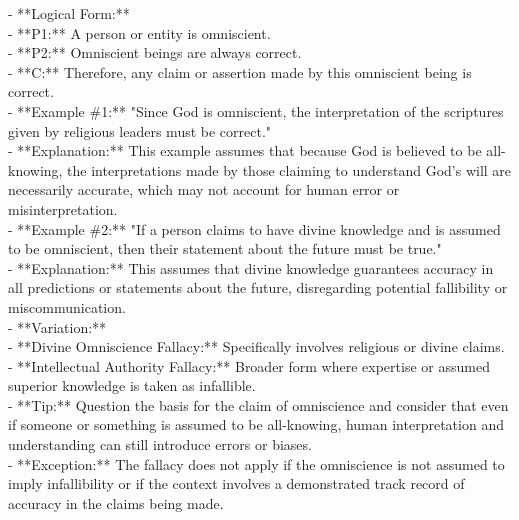 \documentclass[a4paper,12pt,single,pdftex]{scrartcl}
\begin{document}
    
      - **Logical Form:**
    \\

    
        - **P1:** A person or entity is omniscient.
    \\

    
        - **P2:** Omniscient beings are always correct.
    \\

    
        - **C:** Therefore, any claim or assertion made by this omniscient being is correct.
    \\

    
      - **Example \#1:** "Since God is omniscient, the interpretation of the scriptures given by religious leaders must be correct."
    \\

    
      - **Explanation:** This example assumes that because God is believed to be all-knowing, the interpretations made by those claiming to understand God’s will are necessarily accurate, which may not account for human error or misinterpretation.
    \\

    
      - **Example \#2:** "If a person claims to have divine knowledge and is assumed to be omniscient, then their statement about the future must be true."
    \\

    
      - **Explanation:** This assumes that divine knowledge guarantees accuracy in all predictions or statements about the future, disregarding potential fallibility or miscommunication.
    \\

    
      - **Variation:**
    \\

    
        - **Divine Omniscience Fallacy:** Specifically involves religious or divine claims.
    \\

    
        - **Intellectual Authority Fallacy:** Broader form where expertise or assumed superior knowledge is taken as infallible.
    \\

    
      - **Tip:** Question the basis for the claim of omniscience and consider that even if someone or something is assumed to be all-knowing, human interpretation and understanding can still introduce errors or biases.
    \\

    
      - **Exception:** The fallacy does not apply if the omniscience is not assumed to imply infallibility or if the context involves a demonstrated track record of accuracy in the claims being made.
    \\
\end{document}

